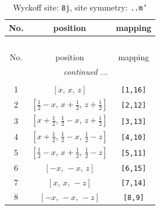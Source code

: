 \documentclass[fleqn,8pt]{jsarticle}
\begin{document}
\begin{longtable}{ccc}
\caption{Wyckoff site: {\tt 8j}, site symmetry: {\tt ..m'}}
 \\
 \hline \hline
No. & position & mapping \\ \hline \endfirsthead

\multicolumn{2}{l}{\tablename\ \thetable{}} \\
 \hline \hline
No. & position & mapping \\ \hline \endhead

 \hline \hline
\multicolumn{2}{r}{\footnotesize\it continued ...} \\ \endfoot

 \hline \hline
\multicolumn{2}{r}{} \\ \endlastfoot

1 & $\left[ x,\, x,\, z \right]$ & {\tt [1,16]} \\ \hline
2 & $\left[ \frac{1}{2} - x,\, x + \frac{1}{2},\, z + \frac{1}{2} \right]$ & {\tt [2,12]} \\ \hline
3 & $\left[ x + \frac{1}{2},\, \frac{1}{2} - x,\, z + \frac{1}{2} \right]$ & {\tt [3,13]} \\ \hline
4 & $\left[ x + \frac{1}{2},\, \frac{1}{2} - x,\, \frac{1}{2} - z \right]$ & {\tt [4,10]} \\ \hline
5 & $\left[ \frac{1}{2} - x,\, x + \frac{1}{2},\, \frac{1}{2} - z \right]$ & {\tt [5,11]} \\ \hline
6 & $\left[ - x,\, - x,\, z \right]$ & {\tt [6,15]} \\ \hline
7 & $\left[ x,\, x,\, - z \right]$ & {\tt [7,14]} \\ \hline
8 & $\left[ - x,\, - x,\, - z \right]$ & {\tt [8,9]} \\
\end{longtable}
\renewcommand{\arraystretch}{1.2}
\end{document}
